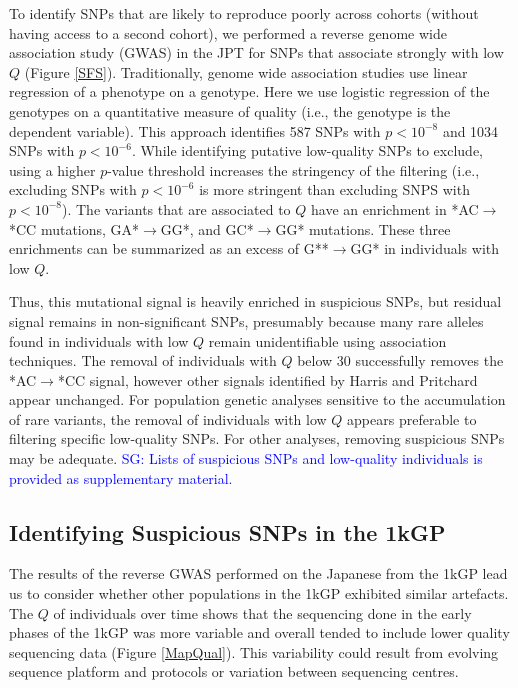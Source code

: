 \documentclass[9pt,lineno]{elife}
\newcommand{\sgcomment}[1]{\textcolor{blue}{SG: #1}}
\begin{document}
To identify SNPs that are likely to reproduce poorly across cohorts (without having access to a second cohort), we performed a reverse genome wide association study (GWAS) in the JPT for SNPs that associate strongly with low $Q$ (Figure \ref{SFS}).
Traditionally, genome wide association studies use linear regression of a phenotype on a genotype. 
Here we use logistic regression of the genotypes on a quantitative measure of quality (i.e., the genotype is the dependent variable).
This approach identifies 587 SNPs with $p < 10^{-8}$ and 1034 SNPs with $ p < 10^{-6}$.
While identifying putative low-quality SNPs to exclude, using a higher $p$-value threshold increases the stringency of the filtering (i.e., excluding SNPs with $ p < 10^{-6}$ is more stringent than excluding SNPS with $p < 10^{-8}$). 
The variants that are associated to $Q$ have an enrichment in *AC${\rightarrow}$*CC mutations, GA*${\rightarrow}$GG*, and GC*${\rightarrow}$GG* mutations.
These three enrichments can be summarized as an excess of G**${\rightarrow}$GG* in individuals with low $Q$.

Thus, this mutational signal is heavily enriched in suspicious SNPs, but residual signal remains in non-significant SNPs, presumably because many rare alleles found in individuals with low $Q$ remain unidentifiable using association techniques. 
The removal of individuals with $Q$ below 30 successfully removes the *AC${\rightarrow}$*CC signal, however other signals identified by Harris and Pritchard appear unchanged. 
For population genetic analyses sensitive to the accumulation of rare variants, the removal of individuals with low $Q$ appears preferable to filtering specific low-quality SNPs. For other analyses, removing suspicious SNPs may be adequate. \sgcomment{Lists of suspicious SNPs and low-quality individuals is provided as supplementary material.}

	\subsection{Identifying Suspicious SNPs in the 1kGP}
The results of the reverse GWAS performed on the Japanese from the 1kGP lead us to consider whether other populations in the 1kGP exhibited similar artefacts.
The $Q$ of individuals over time shows that the sequencing done in the early phases of the 1kGP was more variable and overall tended to include lower quality sequencing data (Figure \ref{MapQual}).
This variability could result from evolving sequence platform and protocols or variation between sequencing centres.
\end{document}
